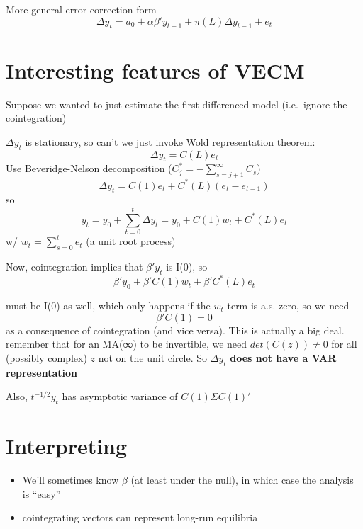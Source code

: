 More general error-correction form
\[Δ y_t = a_0 + αβ' y_{t-1} + π(L) Δ y_{t-1} + e_t\]

\section{Interesting features of VECM}

Suppose we wanted to just estimate the first differenced model
(i.e.~ignore the cointegration)

$Δ y_t$ is stationary, so can't we just invoke Wold representation
theorem:
\[Δ y_t = C(L) e_t\]
Use Beveridge-Nelson decomposition ($C^*_j = - \sum_{s=j+1}^∞ C_s$)
\[Δ y_t = C(1) e_t + C^*(L) (e_t - e_{t-1})\]
so
\[y_t = y_0 + \sum_{t=0}^t Δ y_t = y_0 + C(1) w_t + C^*(L) e_t\]
w/ $w_t = \sum_{s=0}^t e_t$ (a unit root process)

Now, cointegration implies that $β'y_t$ is I(0), so
\[β'y_0 + β'C(1) w_t + β'C^*(L) e_t\]

must be I(0) as well, which only happens if the $w_t$ term is a.s. zero,
so we need
\[β'C(1) = 0\]
as a consequence of cointegration (and vice versa). This is actually a
big deal. remember that for an MA(∞) to be invertible, we need $det(C(z))
≠ 0$ for all (possibly complex) $z$ not on the unit circle. So $Δ y_t$
\textbf{does not have a VAR representation}

Also, $t^{-1/2} y_t$ has asymptotic variance of $C(1) Σ C(1)'$

\section{Interpreting}

\begin{itemize}
\item We'll sometimes know $β$ (at least under the null), in which
  case the analysis is ``easy''
\item cointegrating vectors can represent long-run equilibria
\end{itemize}


